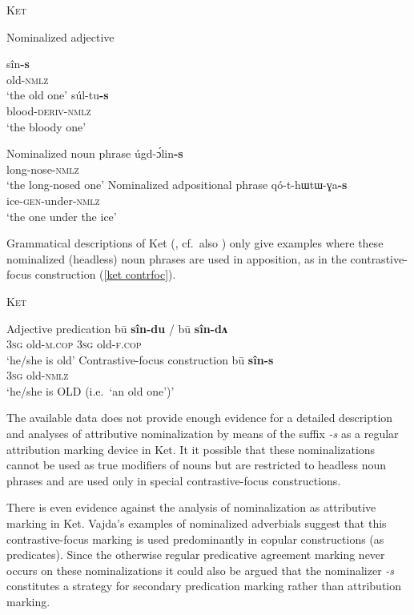 \begin{exe}
\ex \textsc{Ket} \citep{vajda2005}
\begin{xlist}
\ex Nominalized adjective \label{ket adjn nmlz}
\begin{xlist}
\ex	
\gll	sîn\textbf{-s}\\
	old-\textsc{nmlz}\\
\glt	‘the old one’
\ex	
\gll	súl-tu\textbf{-s}\\
	blood-\textsc{deriv-nmlz}\\
\glt	‘the bloody one’
\end{xlist}
\ex	Nominalized noun phrase \label{ket np nmlz}
\gll	úgd-ɔ́lin\textbf{-s}\\
	long-nose-\textsc{nmlz}\\
\glt	‘the long-nosed one’
\ex Nominalized adpositional phrase \label{ket ap nmlz}
\gll	qó-t-{hɯtɯ-ɣa}\textbf{-s}\\
	ice-\textsc{gen}-under-\textsc{nmlz}\\
\glt	‘the one under the ice’
\end{xlist}
\end{exe}
Grammatical descriptions of Ket (\citealt{vajda2004}, cf.~also \citealt{krukova2007}) only give examples where these nominalized (headless) noun phrases are used in apposition, as in the contrastive-focus construction (\ref{ket contrfoc}). 
\begin{exe}
\ex \textsc{Ket} \cite{vajda2005} \label{ket contrfoc}
\begin{xlist}
\ex	Adjective predication
\gll	bū \textbf{sîn-du} / bū \textbf{sîn-dʌ}\\
	3\textsc{sg} old-\textsc{m.cop} { } 3\textsc{sg} old-\textsc{f.cop}\\
\glt	‘he/\-she is old’
\ex	Contrastive-focus construction
\gll	bū \textbf{sîn-s}\\
	3\textsc{sg} old-\textsc{nmlz}\\
\glt	‘he/\-she is OLD (i.e.~‘an old one’)’
\end{xlist}
\end{exe}
The available data does not provide enough evidence for a detailed description and analyses of attributive nominalization by means of the suffix \textit{-s} as a regular attribution marking device in Ket. It it possible that these nominalizations cannot be used as true modifiers of nouns but are restricted to headless noun phrases and are used only in special contrastive-focus constructions.

There is even evidence against the analysis of nominalization as attributive marking in Ket. Vajda's examples of nominalized adverbials suggest that this contrastive-focus marking is used predominantly in copular constructions (as predicates). Since the otherwise regular predicative agreement marking never occurs on these nominalizations \cite[15]{vajda2004} it could also be argued that the nominalizer \textit{-s} constitutes a strategy for secondary predication marking rather than attribution marking.

